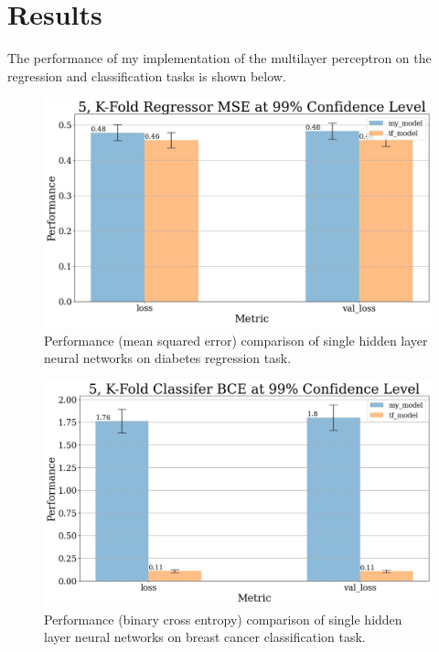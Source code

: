 \documentclass{article}
\begin{document}
\section{Results}

The performance of my implementation of the multilayer perceptron on the
regression and classification tasks is shown below.

\afterpage

\begin{figure}[h]
	\includegraphics[scale=0.35]{one_layer_regressor_bar_chart_2.jpg}
	\caption{Performance (mean squared error) comparison of single hidden
		layer neural networks on diabetes regression task.}
\end{figure}

\begin{figure}[h]
	\includegraphics[scale=0.35]{one_layer_classifier_bar_chart_2.jpg}
	\caption{Performance (binary cross entropy) comparison of single hidden layer
		neural networks on breast cancer classification task.}
\end{figure}
\end{document}
